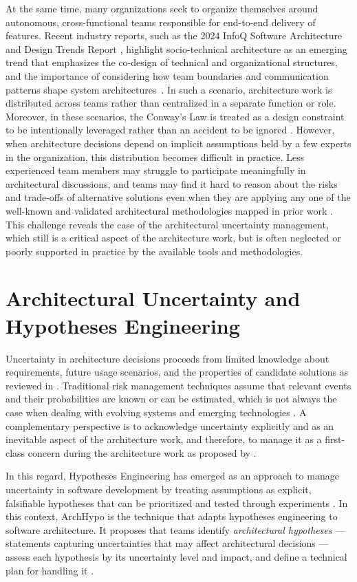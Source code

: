 At the same time, many organizations seek to organize themselves around autonomous, cross-functional teams responsible for end-to-end delivery of features. 
Recent industry reports, such as the 2024 InfoQ Software Architecture and Design Trends Report \citep{infoq2024trends}, highlight socio-technical architecture as an emerging trend that emphasizes the co-design of technical and organizational structures, and the importance of considering how team boundaries and communication patterns shape system architectures~\citep{herbsleb1999splitting}. 
In such a scenario, architecture work is distributed across teams rather than centralized in a separate function or role. Moreover, in these scenarios, the Conway's Law is treated as a design constraint to be intentionally leveraged rather than an accident to be ignored \citep{infoq2024trends}. 
However, when architecture decisions depend on implicit assumptions held by a few experts in the organization, this distribution becomes difficult in practice. Less experienced team members may struggle to participate meaningfully in architectural discussions, and teams may find it hard to reason about the risks and trade-offs of alternative solutions even when they are applying any one of the well-known and validated architectural methodologies mapped in prior work \citep{souza2019}.
This challenge reveals the case of the architectural uncertainty management, which still is a critical aspect of the architecture work, but is often neglected or poorly supported in practice by the available tools and methodologies.

\section{Architectural Uncertainty and Hypotheses Engineering}

Uncertainty in architecture decisions proceeds from limited knowledge about requirements, future usage scenarios, and the properties of candidate solutions as reviewed in \citet{silva2024tse}. 
Traditional risk management techniques assume that relevant events and their probabilities are known or can be estimated, which is not always the case when dealing with evolving systems and emerging technologies \citep{silva2024tse}. 
A complementary perspective is to acknowledge uncertainty explicitly and as an inevitable aspect of the architecture work, and therefore, to manage it as a first-class concern during the architecture work as proposed by \citet{silva2024tse}.

In this regard, Hypotheses Engineering has emerged as an approach to manage uncertainty in software development by treating assumptions as explicit, falsifiable hypotheses that can be prioritized and tested through experiments \citep{melegati2019he,olsson2014hypex,fagerholm2017,silva2024tse,silva2024ieeesw}. In this context, ArchHypo is the technique that adapts hypotheses engineering to software architecture. 
It proposes that teams identify \emph{architectural hypotheses} --- statements capturing uncertainties that may affect architectural decisions --- assess each hypothesis by its uncertainty level and impact, and define a technical plan for handling it \citep{silva2024tse}.

